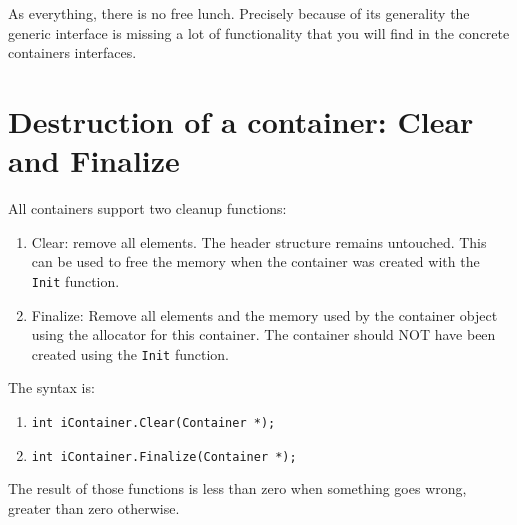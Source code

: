 \documentclass[12pt,a4paper]{memoir} %
\begin{document}
As everything, there is no free lunch. Precisely because of its generality the generic interface is missing a lot of functionality that you will find
in the concrete containers interfaces. 

\section{Destruction of a container: Clear and Finalize}
All containers support two cleanup functions:
	\begin{enumerate}
\item
Clear: remove all elements. The header structure remains untouched. This can be used to free the memory when the container was created with the \texttt{Init} function.
\item
Finalize: Remove all elements and the memory used by the container object using the allocator for this container. The container should NOT have been created using the \texttt{Init} function.
\end{enumerate}
The syntax is:
\begin{enumerate}
\item \texttt{int iContainer.Clear(Container *);}
\item \texttt{int iContainer.Finalize(Container *);}
\end{enumerate}
The result of those functions is less than zero when something goes wrong, greater than zero otherwise.
\end{document}
